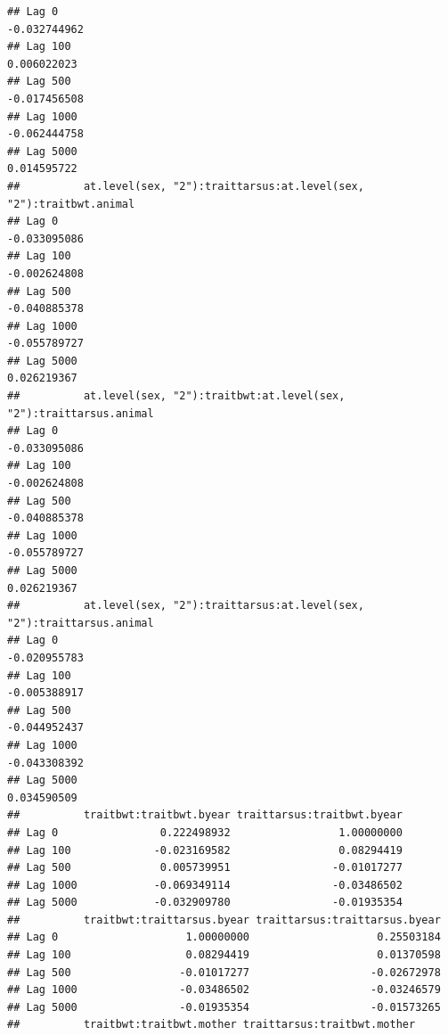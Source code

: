 \documentclass[
  12pt,
]{book}
\begin{document}
\begin{verbatim}
## Lag 0                                                      -0.032744962
## Lag 100                                                     0.006022023
## Lag 500                                                    -0.017456508
## Lag 1000                                                   -0.062444758
## Lag 5000                                                    0.014595722
##          at.level(sex, "2"):traittarsus:at.level(sex, "2"):traitbwt.animal
## Lag 0                                                         -0.033095086
## Lag 100                                                       -0.002624808
## Lag 500                                                       -0.040885378
## Lag 1000                                                      -0.055789727
## Lag 5000                                                       0.026219367
##          at.level(sex, "2"):traitbwt:at.level(sex, "2"):traittarsus.animal
## Lag 0                                                         -0.033095086
## Lag 100                                                       -0.002624808
## Lag 500                                                       -0.040885378
## Lag 1000                                                      -0.055789727
## Lag 5000                                                       0.026219367
##          at.level(sex, "2"):traittarsus:at.level(sex, "2"):traittarsus.animal
## Lag 0                                                            -0.020955783
## Lag 100                                                          -0.005388917
## Lag 500                                                          -0.044952437
## Lag 1000                                                         -0.043308392
## Lag 5000                                                          0.034590509
##          traitbwt:traitbwt.byear traittarsus:traitbwt.byear
## Lag 0                0.222498932                 1.00000000
## Lag 100             -0.023169582                 0.08294419
## Lag 500              0.005739951                -0.01017277
## Lag 1000            -0.069349114                -0.03486502
## Lag 5000            -0.032909780                -0.01935354
##          traitbwt:traittarsus.byear traittarsus:traittarsus.byear
## Lag 0                    1.00000000                    0.25503184
## Lag 100                  0.08294419                    0.01370598
## Lag 500                 -0.01017277                   -0.02672978
## Lag 1000                -0.03486502                   -0.03246579
## Lag 5000                -0.01935354                   -0.01573265
##          traitbwt:traitbwt.mother traittarsus:traitbwt.mother

\end{verbatim}
\end{document}
